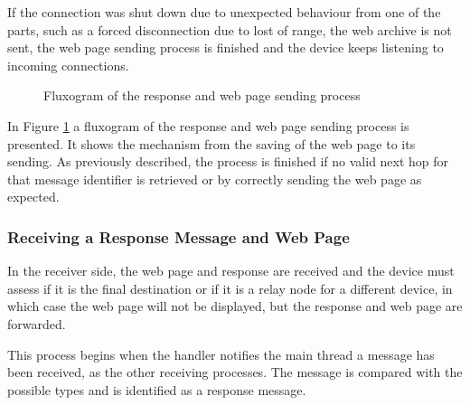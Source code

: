 If the connection was shut down due to unexpected behaviour from one of the parts, such as a forced disconnection due to lost of range, the web archive is not sent, the web page sending process is finished and the device keeps listening to incoming connections.

\begin{figure}[ht]
   \noindent{}
	\caption{\label{fig:rspsendflux} Fluxogram of the response and web page sending process}
\end{figure}

In Figure \ref{fig:rspsendflux} a fluxogram of the response and web page sending process is presented. It shows the mechanism from the saving of the web page to its sending. As previously described, the process is finished if no valid next hop for that message identifier is retrieved or by correctly sending the web page as expected.

\subsubsection{Receiving a Response Message and Web Page}
\label{subsubsec:rcvrsp}

In the receiver side, the web page and response are received and the device must assess if it is the final destination or if it is a relay node for a different device, in which case the web page will not be displayed, but the response and web page are forwarded.

This process begins when the handler notifies the main thread a message has been received, as the other receiving processes. The message is compared with the possible types and is identified as a response message.

